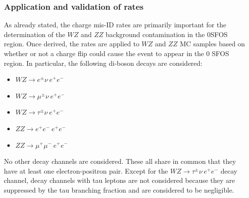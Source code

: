 \subsubsection{Application and validation of rates}
As already stated, the charge mis-ID rates are primarily important for the determination of the $WZ$ and $ZZ$ background contamination in the 0SFOS region. 
Once derived, the rates are applied to $WZ$ and $ZZ$ MC samples based on whether or not a charge flip could cause the event to appear in the 0 SFOS region.  
In particular, the following di-boson decays are considered:
\begin{itemize}
\item $WZ\rightarrow e^{\pm}\nu~ e^{+}e^{-}$
\item $WZ\rightarrow \mu^{\pm}\nu~ e^{+}e^{-}$
\item $WZ\rightarrow \tau^{\pm}\nu~ e^{+}e^{-}$
\item $ZZ\rightarrow e^{+}e^{-}~e^{+}e^{-}$
\item $ZZ\rightarrow \mu^{+}\mu^{-}~ e^{+}e^{-}$
\end{itemize}
No other decay channels are considered.  These all share in common that they have at least one electron-positron pair.  
Except for the $WZ\rightarrow \tau^{\pm}\nu~e^{+}e^{-}$ decay channel, decay channels with tau leptons are not considered
because they are suppressed by the tau branching fraction and are considered to be negligible.

